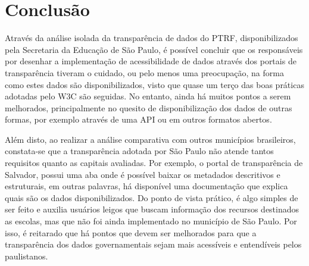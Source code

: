 \chapter{Conclusão}

Através da análise isolada da transparência de dados do PTRF, disponibilizados pela Secretaria da Educação de São Paulo, é possível concluir que os responsáveis por desenhar a implementação de acessibilidade de dados através dos portais de transparência tiveram o cuidado, ou pelo menos uma preocupação, na forma como estes dados são disponibilizados, visto que quase um terço das boas práticas adotadas pelo W3C são seguidas. No entanto, ainda há muitos pontos a serem melhorados, principalmente no quesito de disponibilização dos dados de outras formas, por exemplo através de uma API ou em outros formatos abertos.

Além disto, ao realizar a análise comparativa com outros municípios brasileiros, constata-se que a transparência adotada por São Paulo não atende tantos requisitos quanto as capitais avaliadas. Por exemplo, o portal de transparência de Salvador, possui uma aba onde é possível baixar os metadados descritivos e estruturais, em outras palavras, há disponível uma documentação que explica quais são os dados disponibilizados. Do ponto de vista prático, é algo simples de ser feito e auxilia usuários leigos que buscam informação dos recursos destinados as escolas, mas que não foi ainda implementado no município de São Paulo. Por isso, é reitarado que há pontos que devem ser melhorados para que a transparência dos dados governamentais sejam mais acessíveis e entendíveis pelos paulistanos.

